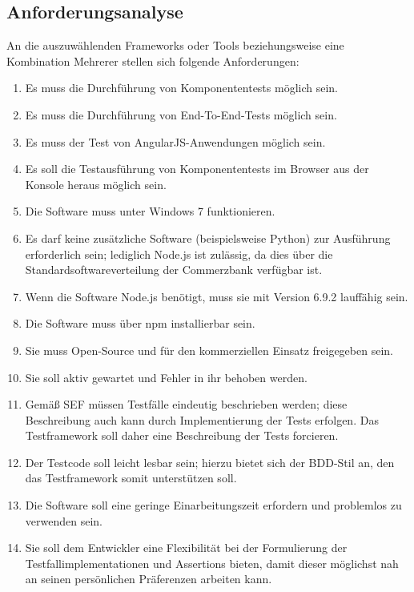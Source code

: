 \subsection{Anforderungsanalyse}
An die auszuwählenden Frameworks oder Tools beziehungsweise eine Kombination Mehrerer stellen sich folgende Anforderungen:
\begin{enumerate}
	\item Es muss die Durchführung von Komponententests möglich sein.
	\item Es muss die Durchführung von End-To-End-Tests möglich sein.
	\item Es muss der Test von AngularJS-Anwendungen möglich sein.
	\item Es soll die Testausführung von Komponententests im Browser aus der Konsole heraus möglich sein.
	\item Die Software muss unter Windows 7 funktionieren.
	\item Es darf keine zusätzliche Software (beispielsweise Python) zur Ausführung erforderlich sein; lediglich Node.js ist zulässig, da dies über die Standardsoftwareverteilung der Commerzbank verfügbar ist.
	\item Wenn die Software Node.js benötigt, muss sie mit Version 6.9.2 lauffähig sein.
	\item Die Software muss über npm installierbar sein.
	\item Sie muss Open-Source und für den kommerziellen Einsatz freigegeben sein.
	\item Sie soll aktiv gewartet und Fehler in ihr behoben werden.
	\item Gemäß SEF müssen Testfälle eindeutig beschrieben werden; diese Beschreibung auch kann durch Implementierung der Tests erfolgen\cite{coba-sef}. Das Testframework soll daher eine Beschreibung der Tests forcieren.
	\item Der Testcode soll leicht lesbar sein\cite[][7]{coba-programmierrichtlinienAllgemein}; hierzu bietet sich der BDD-Stil an, den das Testframework somit unterstützen soll.
	\item Die Software soll eine geringe Einarbeitungszeit erfordern und problemlos zu verwenden sein. 
	\item Sie soll dem Entwickler eine Flexibilität bei der Formulierung der Testfallimplementationen und Assertions bieten, damit dieser möglichst nah an seinen persönlichen Präferenzen arbeiten kann.

\end{enumerate}

